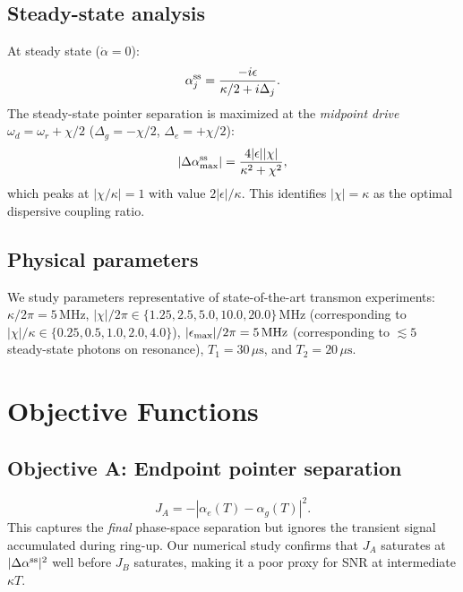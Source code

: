 \documentclass[twocolumn,prl,aps,floatfix]{revtex4-2}
\begin{document}
\subsection{Steady-state analysis}

At steady state ($\dot{\alpha} = 0$):
\begin{equation}
  \alpha_j^{\rm ss} = \frac{-i\epsilon}{\kappa/2 + i\Delta_j}.
  \label{eq:ss}
\end{equation}
The steady-state pointer separation is maximized at the \emph{midpoint drive}
$\omega_d = \omega_r + \chi/2$ ($\Delta_g = -\chi/2$, $\Delta_e = +\chi/2$):
\begin{equation}
  |\Delta\alpha^{\rm ss}_{\rm max}| = \frac{4|\epsilon||\chi|}{\kappa^2 + \chi^2},
  \label{eq:sep_formula}
\end{equation}
which peaks at $|\chi/\kappa| = 1$ with value $2|\epsilon|/\kappa$.  This identifies
$|\chi| = \kappa$ as the optimal dispersive coupling ratio.

\subsection{Physical parameters}

We study parameters representative of state-of-the-art transmon experiments:
$\kappa/2\pi = 5\,\mathrm{MHz}$, $|\chi|/2\pi \in \{1.25, 2.5, 5.0, 10.0, 20.0\}\,\mathrm{MHz}$
(corresponding to $|\chi|/\kappa \in \{0.25, 0.5, 1.0, 2.0, 4.0\}$),
$|\epsilon_{\rm max}|/2\pi = 5\,\mathrm{MHz}$ (corresponding to $\lesssim 5$ steady-state
photons on resonance), $T_1 = 30\,\mu\mathrm{s}$, and $T_2 = 20\,\mu\mathrm{s}$.

\section{Objective Functions}

\subsection{Objective A: Endpoint pointer separation}
\begin{equation}
  J_A = -|\alpha_e(T) - \alpha_g(T)|^2.
\end{equation}
This captures the \emph{final} phase-space separation but ignores the transient
signal accumulated during ring-up.  Our numerical study confirms that $J_A$ saturates
at $|\Delta\alpha^{\rm ss}|^2$ well before $J_B$ saturates, making it a poor proxy
for SNR at intermediate $\kappa T$.
\end{document}
